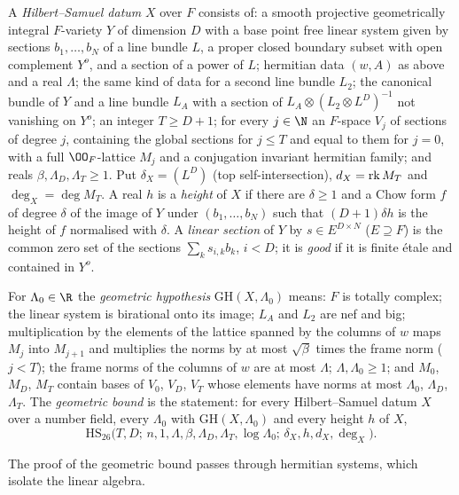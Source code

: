 \begin{definition}\label{pf:lift1:hsdata}
A \emph{Hilbert--Samuel datum} $X$ over $F$ consists of: a smooth projective geometrically integral
$F$-variety $Y$ of dimension $D$ with a base point free linear system given by sections
$b_1,\dots,b_N$ of a line bundle $L$, a proper closed boundary subset with open complement $Y^o$, and a
section of a power of $L$; hermitian data $(w,A)$ as above and a real $\Lambda$; the same kind of data for
a second line bundle $L_2$; the canonical bundle of $Y$ and a line bundle $L_A$ with a section of
$L_A\otimes(L_2\otimes L^{D})^{-1}$ not vanishing on $Y^o$; an integer $T\ge D+1$; for every $j\in\N$ an
$F$-space $V_j$ of sections of degree $j$, containing the global sections for $j\le T$ and equal to them for
$j=0$, with a full $\OO_F$-lattice $M_j$ and a conjugation invariant hermitian family; and reals
$\beta,\Lambda_D,\Lambda_T\ge1$. Put $\delta_X=(L^D)$ (top self-intersection), $d_X=\operatorname{rk} M_T$ and
$\deg_X=\deg M_T$. A real $h$ is a \emph{height} of $X$ if there are $\delta\ge1$ and a Chow form $f$ of
degree $\delta$ of the image of $Y$ under $(b_1,\dots,b_N)$ such that $(D+1)\delta h$ is the height of $f$
normalised with $\delta$. A \emph{linear section} of $Y$ by $s\in E^{D\times N}$ ($E\supseteq F$) is the
common zero set of the sections $\sum_ks_{i,k}b_k$, $i<D$; it is \emph{good} if it is finite \'etale and
contained in $Y^o$.

For $\Lambda_0\in\R$ the \emph{geometric hypothesis} $\mathrm{GH}(X,\Lambda_0)$ means: $F$ is totally
complex; the linear system is birational onto its image; $L_A$ and $L_2$ are nef and big; multiplication
by the elements of the lattice spanned by the columns of $w$ maps $M_j$ into $M_{j+1}$ and multiplies the
norms by at most $\sqrt\beta$ times the frame norm ($j<T$); the frame norms of the columns of $w$ are at
most $\Lambda$; $\Lambda,\Lambda_0\ge1$; and $M_0$, $M_D$, $M_T$ contain bases of $V_0$, $V_D$, $V_T$ whose
elements have norms at most $\Lambda_0$, $\Lambda_D$, $\Lambda_T$. The \emph{geometric bound} is the
statement: for every Hilbert--Samuel datum $X$ over a number field, every $\Lambda_0$ with
$\mathrm{GH}(X,\Lambda_0)$ and every height $h$ of $X$,
\[
\mathrm{HS}_{26}\bigl(T,D;\,n,1,\Lambda,\beta,\Lambda_D,\Lambda_T,\log\Lambda_0;\,\delta_X,h,d_X,\deg_X\bigr).
\]
\end{definition}

The proof of the geometric bound passes through hermitian systems, which isolate the linear algebra.

